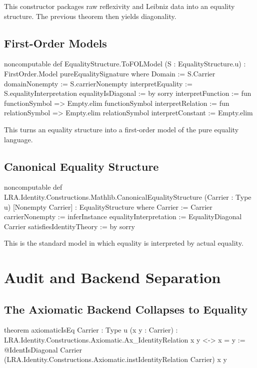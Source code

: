 \documentclass[11pt]{article}
\begin{document}
This constructor packages raw reflexivity and Leibniz data into an equality structure. The previous theorem then yields diagonality.

\subsection{First-Order Models}

\begin{leanblock}
noncomputable def EqualityStructure.ToFOLModel
    (S : EqualityStructure.{u}) :
    FirstOrder.Model pureEqualitySignature where
  Domain := S.Carrier
  domainNonempty := S.carrierNonempty
  interpretEquality := S.equalityInterpretation
  equalityIsDiagonal := by sorry
  interpretFunction := fun functionSymbol => Empty.elim functionSymbol
  interpretRelation := fun relationSymbol => Empty.elim relationSymbol
  interpretConstant := Empty.elim
\end{leanblock}

This turns an equality structure into a first-order model of the pure equality language.

\subsection{Canonical Equality Structure}

\begin{leanblock}
noncomputable def LRA.Identity.Constructions.Mathlib.CanonicalEqualityStructure
    (Carrier : Type u) [Nonempty Carrier] :
    EqualityStructure where
  Carrier := Carrier
  carrierNonempty := inferInstance
  equalityInterpretation := EqualityDiagonal Carrier
  satisfiesIdentityTheory := by sorry
\end{leanblock}

This is the standard model in which equality is interpreted by actual equality.

\section{Audit and Backend Separation}

\subsection{The Axiomatic Backend Collapses to Equality}

\begin{leanblock}
theorem axiomaticIsEq {Carrier : Type u} (x y : Carrier) :
    LRA.Identity.Constructions.Axiomatic.Ax_IdentityRelation x y <-> x = y :=
  @IdentIsDiagonal Carrier
    (LRA.Identity.Constructions.Axiomatic.instIdentityRelation Carrier) x y
\end{leanblock}
\end{document}
